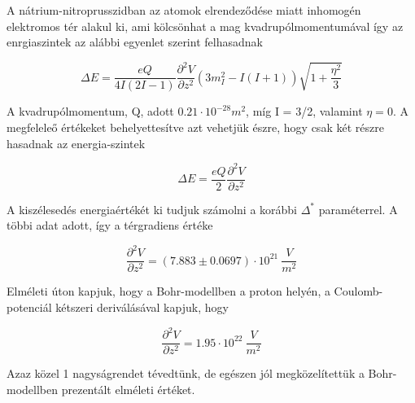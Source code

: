 \documentclass[a4paper,12pt]{article}
\begin{document}
\par A nátrium-nitroprusszidban az atomok elrendeződése miatt inhomogén elektromos tér alakul ki, ami kölcsönhat a mag kvadrupólmomentumával így az enrgiaszintek az alábbi egyenlet szerint felhasadnak

\begin{equation*}
\Delta E = \frac{eQ}{4I(2I - 1)}\frac{\partial^{2}V}{\partial z^{2}}(3m_{I}^{2} - I(I+1))\sqrt{1+\frac{\eta^{2}}{3}}
\end{equation*}

\par A kvadrupólmomentum, Q, adott $0.21\cdot 10^{-28} m^{2}$, míg I = 3/2, valamint $\eta = 0$. A megfeleleő értékeket behelyettesítve azt vehetjük észre, hogy csak két részre hasadnak az energia-szintek

\begin{equation*}
\Delta E = \frac{eQ}{2}\frac{\partial^{2} V}{\partial z^{2}}
\end{equation*}

\par A kiszélesedés energiaértékét ki tudjuk számolni a korábbi $\Delta^{*}$ paraméterrel. A többi adat adott, így a térgradiens értéke

\begin{equation*}
\frac{\partial^{2}V}{\partial z^{2}} = (7.883 \pm 0.0697) \cdot 10^{21} ~\frac{V}{m^{2}}
\end{equation*}

\par Elméleti úton kapjuk, hogy a Bohr-modellben a proton helyén, a Coulomb-potenciál kétszeri deriválásával kapjuk, hogy

\begin{equation*}
\frac{\partial^{2}V}{\partial z^{2}} = 1.95 \cdot 10^{22} ~\frac{V}{m^{2}}
\end{equation*}

\par Azaz közel 1 nagyságrendet tévedtünk, de egészen jól megközelítettük a Bohr-modellben prezentált elméleti értéket. 
\end{document}
